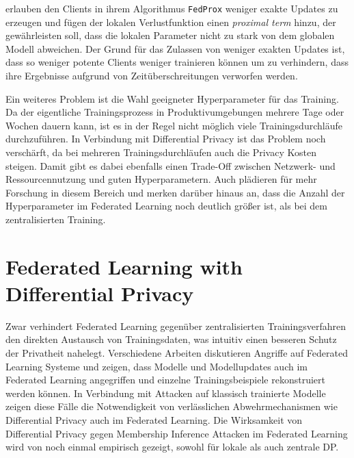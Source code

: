 \textcite{li:2020} erlauben den Clients in ihrem Algorithmus \texttt{FedProx} weniger exakte Updates zu erzeugen und fügen der lokalen Verlustfunktion einen \textit{proximal term} hinzu, der gewährleisten soll, dass die lokalen Parameter nicht zu stark von dem globalen Modell abweichen. Der Grund für das Zulassen von weniger exakten Updates ist, dass so weniger potente Clients weniger trainieren können um zu verhindern, dass ihre Ergebnisse aufgrund von Zeitüberschreitungen verworfen werden.

Ein weiteres Problem ist die Wahl geeigneter Hyperparameter für das Training. Da der eigentliche Trainingsprozess in Produktivumgebungen mehrere Tage\cite[p.5]{hard:2018} oder Wochen\cite[p.4]{ramaswamy:2020} dauern kann, ist es in der Regel nicht möglich viele Trainingsdurchläufe durchzuführen. In Verbindung mit Differential Privacy ist das Problem noch verschärft, da bei mehreren Trainingsdurchläufen auch die Privacy Kosten steigen. Damit gibt es dabei ebenfalls einen Trade-Off zwischen Netzwerk- und Ressourcennutzung und guten Hyperparametern. Auch \textcite[p.31]{kairouz:2021} plädieren für mehr Forschung in diesem Bereich und merken darüber hinaus an, dass die Anzahl der Hyperparameter im Federated Learning noch deutlich größer ist, als bei dem zentralisierten Training.

\section{Federated Learning with Differential Privacy}\label{sec:rw-fldp}
Zwar verhindert Federated Learning gegenüber zentralisierten Trainingsverfahren den direkten Austausch von Trainingsdaten, was intuitiv einen besseren Schutz der Privatheit nahelegt. Verschiedene Arbeiten \cite{wang:2019, geiping:2020, ma:2020} diskutieren Angriffe auf Federated Learning Systeme und zeigen, dass Modelle und Modellupdates auch im Federated Learning angegriffen und einzelne Trainingsbeispiele rekonstruiert werden können. In Verbindung mit Attacken auf klassisch trainierte Modelle zeigen diese Fälle die Notwendigkeit von verlässlichen Abwehrmechanismen wie Differential Privacy auch im Federated Learning. Die Wirksamkeit von Differential Privacy gegen Membership Inference Attacken im Federated Learning wird von \textcite{naseri:2022} noch einmal empirisch gezeigt, sowohl für lokale als auch zentrale DP.

